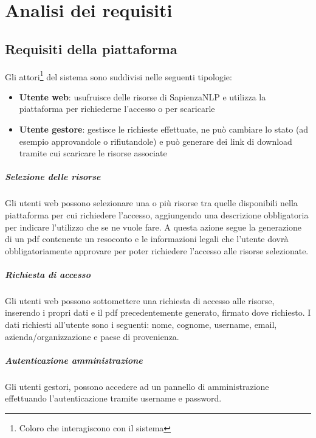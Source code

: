 
\chapter{Analisi dei requisiti}


\section{Requisiti della piattaforma}
Gli attori\footnote{Coloro che interagiscono con il sistema} del sistema
sono suddivisi nelle seguenti tipologie:
\begin{itemize}
	\item \textbf{Utente web}: usufruisce delle risorse di SapienzaNLP e utilizza
	la piattaforma per richiederne l'accesso o per scaricarle
	\item \textbf{Utente gestore}: gestisce le richieste effettuate, ne
	può cambiare lo stato (ad esempio approvandole o rifiutandole) e può generare
	dei link di download tramite cui scaricare le risorse associate
\end{itemize}

\paragraph{Selezione delle risorse}
Gli utenti web possono selezionare una o più risorse tra quelle disponibili nella
piattaforma per cui richiedere l'accesso, aggiungendo una descrizione obbligatoria
per indicare l'utilizzo che se ne vuole fare. A questa azione segue la generazione
di un pdf contenente un resoconto e le informazioni legali che l'utente dovrà
obbligatoriamente approvare per poter richiedere l'accesso alle risorse selezionate.

\paragraph{Richiesta di accesso} \label{par:access-request}
Gli utenti web possono sottomettere una richiesta di accesso alle risorse, inserendo
i propri dati e il pdf precedentemente generato, firmato dove richiesto.
I dati richiesti all'utente sono i seguenti: nome, cognome, username, email,
azienda/organizzazione e paese di provenienza.

\paragraph{Autenticazione amministrazione}
Gli utenti gestori, possono accedere ad un pannello di amministrazione
effettuando l'autenticazione tramite username e password.

